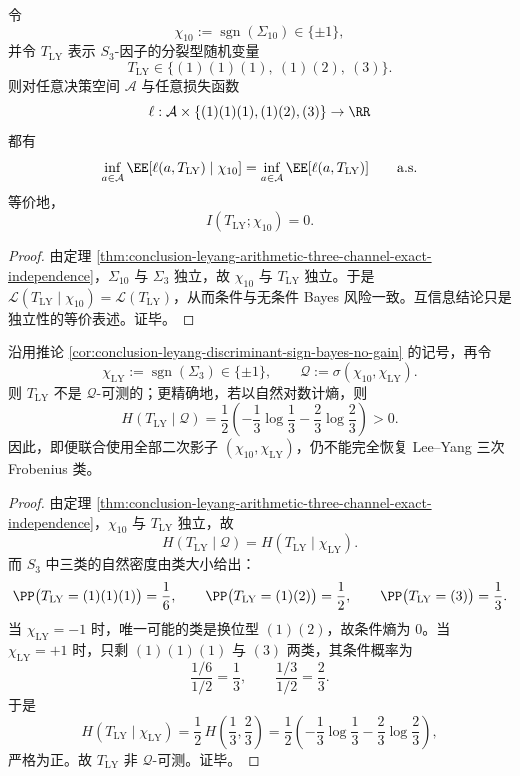 \begin{corollary}\label{cor:conclusion-leyang-discriminant-sign-bayes-no-gain}
令
\[
\chi_{10}:=\operatorname{sgn}(\Sigma_{10})\in\{\pm1\},
\]
并令 \(T_{\mathrm{LY}}\) 表示 \(S_3\)-因子的分裂型随机变量
\[
T_{\mathrm{LY}}\in\{(1)(1)(1),\ (1)(2),\ (3)\}.
\]
则对任意决策空间 \(\mathcal A\) 与任意损失函数
\[
\ell:\mathcal A\times \{(1)(1)(1),(1)(2),(3)\}\to \RR
\]
都有
\[
\inf_{a\in\mathcal A}\EE[\ell(a,T_{\mathrm{LY}})\mid \chi_{10}]
=
\inf_{a\in\mathcal A}\EE[\ell(a,T_{\mathrm{LY}})]
\qquad\text{a.s.}
\]
等价地，
\[
I(T_{\mathrm{LY}};\chi_{10})=0.
\]
\end{corollary}
\begin{proof}
由定理 \ref{thm:conclusion-leyang-arithmetic-three-channel-exact-independence}，\(\Sigma_{10}\) 与 \(\Sigma_3\) 独立，故 \(\chi_{10}\) 与 \(T_{\mathrm{LY}}\) 独立。于是 \(\mathcal L(T_{\mathrm{LY}}\mid \chi_{10})=\mathcal L(T_{\mathrm{LY}})\)，从而条件与无条件 Bayes 风险一致。互信息结论只是独立性的等价表述。证毕。
\end{proof}

\begin{theorem}\label{thm:conclusion-leyang-quadratic-shadows-incomplete-with-exact-conditional-entropy}
沿用推论 \ref{cor:conclusion-leyang-discriminant-sign-bayes-no-gain} 的记号，再令
\[
\chi_{\mathrm{LY}}:=\operatorname{sgn}(\Sigma_3)\in\{\pm1\},
\qquad
\mathcal Q:=\sigma(\chi_{10},\chi_{\mathrm{LY}}).
\]
则 \(T_{\mathrm{LY}}\) 不是 \(\mathcal Q\)-可测的；更精确地，若以自然对数计熵，则
\[
H(T_{\mathrm{LY}}\mid \mathcal Q)
=
\frac12\left(-\frac13\log\frac13-\frac23\log\frac23\right)
>0.
\]
因此，即便联合使用全部二次影子 \((\chi_{10},\chi_{\mathrm{LY}})\)，仍不能完全恢复 Lee--Yang 三次 Frobenius 类。
\end{theorem}
\begin{proof}
由定理 \ref{thm:conclusion-leyang-arithmetic-three-channel-exact-independence}，\(\chi_{10}\) 与 \(T_{\mathrm{LY}}\) 独立，故
\[
H(T_{\mathrm{LY}}\mid \mathcal Q)=H(T_{\mathrm{LY}}\mid \chi_{\mathrm{LY}}).
\]
而 \(S_3\) 中三类的自然密度由类大小给出：
\[
\PP\bigl(T_{\mathrm{LY}}=(1)(1)(1)\bigr)=\frac16,\qquad
\PP\bigl(T_{\mathrm{LY}}=(1)(2)\bigr)=\frac12,\qquad
\PP\bigl(T_{\mathrm{LY}}=(3)\bigr)=\frac13.
\]
当 \(\chi_{\mathrm{LY}}=-1\) 时，唯一可能的类是换位型 \((1)(2)\)，故条件熵为 \(0\)。当 \(\chi_{\mathrm{LY}}=+1\) 时，只剩 \((1)(1)(1)\) 与 \((3)\) 两类，其条件概率为
\[
\frac{1/6}{1/2}=\frac13,\qquad
\frac{1/3}{1/2}=\frac23.
\]
于是
\[
H(T_{\mathrm{LY}}\mid \chi_{\mathrm{LY}})
=
\frac12\,H\!\left(\frac13,\frac23\right)
=
\frac12\left(-\frac13\log\frac13-\frac23\log\frac23\right),
\]
严格为正。故 \(T_{\mathrm{LY}}\) 非 \(\mathcal Q\)-可测。证毕。
\end{proof}

